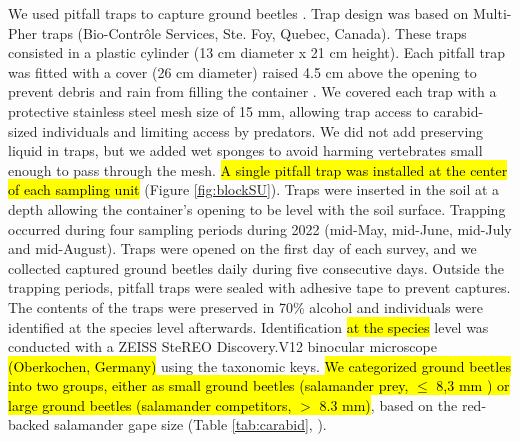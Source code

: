 We used pitfall traps to capture ground beetles \citep{baarsCatchesPitfallTraps1979,spenceSamplingCarabidAssemblages1994a,loveiEcologyBehaviorGround1996,kotzeFortyYearsCarabid2011a,knappEffectPitfallTrap2012}. 
Trap design was based on Multi-Pher traps (Bio-Contrôle Services, Ste. Foy, Quebec, Canada). 
These traps consisted in a plastic cylinder (13 cm diameter x 21 cm height). 
Each pitfall trap was fitted with a cover (26 cm diameter) raised 4.5 cm above the opening to prevent debris and rain from filling the container \citep{Jobin1988MultiPherinsect,Moore2004Effectstwo,bouchardBeetleCommunityResponse2016b}. 
We covered each trap with a protective stainless steel mesh size of 15 mm, allowing trap access to carabid-sized individuals and limiting access by predators.  
We did not add preserving liquid in traps, but we added wet sponges to avoid harming vertebrates small enough to pass through the mesh. 
\hl{A single pitfall trap was installed at the center of each sampling unit} (Figure \ref{fig:blockSU}). 
Traps were inserted in the soil at a depth allowing the container’s opening to be level with the soil surface. 
Trapping occurred during four sampling periods during 2022 (mid-May, mid-June, mid-July and mid-August). 
Traps were opened on the first day of each survey, and we collected captured ground beetles daily during five consecutive days. 
Outside the trapping periods, pitfall traps were sealed with adhesive tape to prevent captures. 
The contents of the traps were preserved in 70\% alcohol and individuals were identified at the species level afterwards. 
Identification \hl{at the species} level was conducted with a ZEISS SteREO Discovery.V12 binocular microscope \hl{(Oberkochen, Germany)} using the \cite{larochelleManuelIdentificationCarabidae1976} taxonomic keys. 
\hl{We categorized ground beetles into two groups, either as small ground beetles (salamander prey, $\leq$ 8,3 mm ) or large ground beetles (salamander competitors, $>$ 8.3 mm)}, based on the red-backed salamander gape size (Table \ref{tab:carabid}, \citealp{jaegerFoodLimitedResource1972,magliaModulationPreycaptureBehavior1995,magliaOntogenyFeedingEcology1996}).

